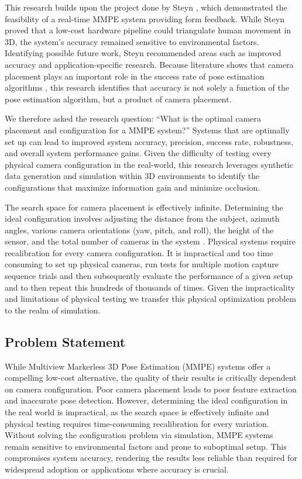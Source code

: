 This research builds upon the project done by Steyn \cite{steyn2024markerless}, which demonstrated the feasibility of a real-time MMPE system providing form feedback. While Steyn \cite{steyn2024markerless} proved that a low-cost hardware pipeline could triangulate human movement in 3D, the system’s accuracy remained sensitive to environmental factors. Identifying possible future work, Steyn \cite{steyn2024markerless} recommended areas such as improved accuracy and application-specific research. Because literature shows that camera placement plays an important role in the success rate of pose estimation algorithms \cite{rahimian2016optimal, jorgensen2018simulation}, this research identifies that accuracy is not solely a function of the pose estimation algorithm, but a product of camera placement.

We therefore asked the research question: ``What is the optimal camera placement and configuration for a MMPE system?'' Systems that are optimally set up can lead to improved system accuracy, precision, success rate, robustness, and overall system performance gains. Given the difficulty of testing every physical camera configuration in the real-world, this research leverages synthetic data generation and simulation within 3D environments to identify the configurations that maximize information gain and minimize occlusion.

The search space for camera placement is effectively infinite. Determining the ideal configuration involves adjusting the distance from the subject, azimuth angles, various camera orientations (yaw, pitch, and roll), the height of the sensor, and the total number of cameras in the system \cite{zhao2013approximate}. Physical systems require recalibration for every camera configuration. It is impractical and too time consuming to set up physical cameras, run tests for multiple motion capture sequence trials and then subsequently evaluate the performance of a given setup and to then repeat this hundreds of thousands of times. \cite{jorgensen2018simulation}
Given the impracticality and limitations of physical testing we transfer this physical optimization problem to the realm of simulation.

\subsection{Problem Statement}
\label{sec:problemstatement}

While Multiview Markerless 3D Pose Estimation (MMPE) systems offer a compelling low-cost alternative, the quality of their results is critically dependent on camera configuration. Poor camera placement leads to poor feature extraction and inaccurate pose detection. However, determining the ideal configuration in the real world is impractical, as the search space is effectively infinite and physical testing requires time-consuming recalibration for every variation. Without solving the configuration problem via simulation, MMPE systems remain sensitive to environmental factors and prone to suboptimal setup. This compromises system accuracy, rendering the results less reliable than required for widespread adoption or applications where accuracy is crucial.

